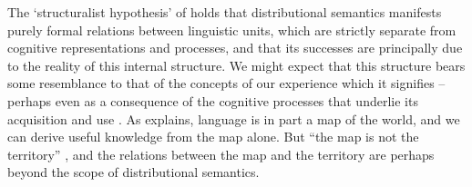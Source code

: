 The `structuralist hypothesis' of \textcites{Gastaldi2021}{Gastaldi2021a} holds that
distributional semantics manifests purely formal relations between linguistic units,
which are strictly separate from cognitive representations and processes, and that its
successes are principally due to the reality of this internal structure.
We might expect that this structure bears some resemblance to that of the concepts of
our experience which it signifies -- perhaps even as a consequence of the cognitive
processes that underlie its acquisition and use \parencites[see][]{Goldsmith2005}.
As \textcites[5-8]{Landauer2011} explains, language is in part a map of the world, and
we can derive useful knowledge from the map alone.
But ``the map is not the territory'' \parencites[58]{Korzybski1995}, and the relations
between the map and the territory are perhaps beyond the scope of distributional
semantics.

